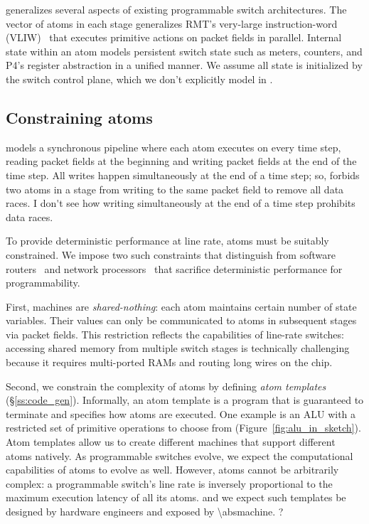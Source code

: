 \absmachine generalizes several aspects of existing programmable switch
architectures. The vector of atoms in each stage generalizes RMT's very-large
instruction-word (VLIW)~\cite{rmt} that executes primitive actions on packet
fields in parallel. Internal state within an atom models persistent switch
state such as meters, counters, and P4's register abstraction in a unified
manner. We assume all state is initialized by the switch control plane, which
we don't explicitly model in \absmachine.

\subsection{Constraining atoms}
\label{s:atomConstraints}

\absmachine models a synchronous pipeline where each atom executes on every
time step, reading packet fields at the beginning and writing packet fields at
the end of the time step. All writes happen simultaneously at the end
of a time step; so, \absmachine forbids two atoms in a stage from writing to
the same packet field to remove all data races. \ac{I don't see how writing 
simultaneously at the end of a time step prohibits data races.}

To provide deterministic performance at line rate, atoms must be suitably
constrained.  We impose two such constraints that distinguish \absmachine from
software routers~\cite{click} and network processors~\cite{ixp4xx} that
sacrifice deterministic performance for programmability.

First, \absmachine machines are \textit{shared-nothing}: each atom maintains
certain number of state variables. 
Their values can only be communicated to atoms in
subsequent stages via packet fields. This restriction reflects
the capabilities of line-rate switches: accessing shared memory from multiple
switch stages is technically challenging because it requires multi-ported RAMs
and routing long wires on the chip.

Second, we constrain the complexity of atoms by defining {\it atom templates}
(\S\ref{ss:code_gen}).  Informally, an atom template is a program that is
guaranteed to terminate and specifies how atoms are executed. One example is an
ALU with a restricted set of primitive operations to choose from
(Figure~\ref{fig:alu_in_sketch}). Atom templates allow us to create different
\absmachine machines that support different atoms natively. As programmable
switches evolve, we expect the computational capabilities of atoms to evolve as
well. However, atoms cannot be arbitrarily complex: a programmable switch's
line rate is inversely proportional to the maximum execution latency of all its
atoms. \ac{and we expect such templates be designed by hardware engineers 
and exposed by \absmachine. ?}
